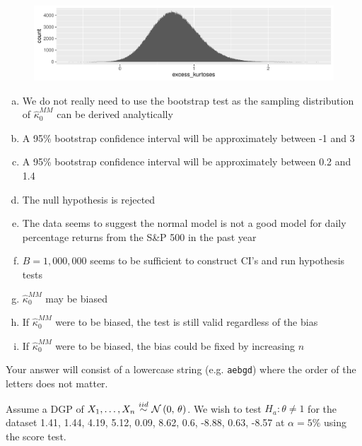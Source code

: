 \documentclass[12pt,landscape]{article}
\newcommand{\instr}{\small Your answer will consist of a lowercase string (e.g. \texttt{aebgd}) where the order of the letters does not matter. \normalsize}
\begin{document}
\begin{figure}[h]
\centering
\includegraphics[width=7in]{boot}
\end{figure}


\vspace{-0.9cm}
\benum{} 
\begin{enumerate}[(a)]
\item We do not really need to use the bootstrap test as the sampling distribution of $\hat{\kappa}^{MM}_0$ can be derived analytically
\item A 95\% bootstrap confidence interval will be approximately between -1 and 3
\item A 95\% bootstrap confidence interval will be approximately between 0.2 and 1.4
\item The null hypothesis is rejected
\item The data seems to suggest the normal model is not a good model for daily percentage returns from the S\&P 500 in the past year
\item $B=1,000,000$ seems to be sufficient to construct CI's and run hypothesis tests
\item $\hat{\kappa}^{MM}_0$ may be biased
\item If $\hat{\kappa}^{MM}_0$ were to be biased, the test is still valid regardless of the bias
\item If $\hat{\kappa}^{MM}_0$ were to be biased, the bias could be fixed by increasing $n$
\end{enumerate}
\eenum\instr\pagebreak



\problem{} Assume a DGP of $\Xoneton \iid \normnot{0}{\theta}$. We wish to test $H_a: \theta \neq 1$ for the dataset 1.41, 1.44, 4.19, 5.12, 0.09, 8.62, 0.6, -8.88, 0.63, -8.57 at $\alpha = 5\%$ using the score test.
\end{document}
